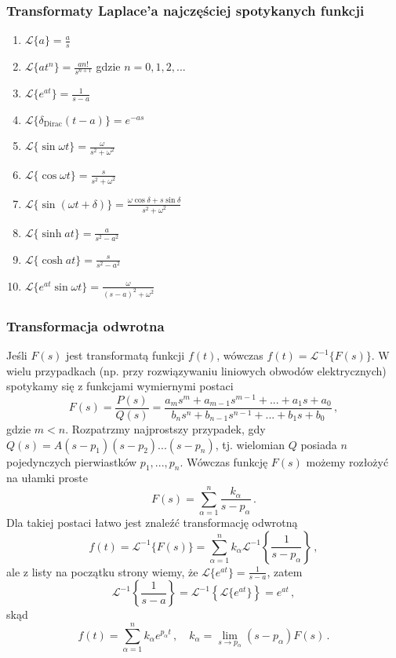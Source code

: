 \documentclass[../main.tex]{subfiles}
\begin{document}
\subsubsection*{Transformaty Laplace'a najczęściej spotykanych funkcji}
\begin{enumerate}
    \item \(\mathscr{L}\{a\}=\frac{a}{s}\)
    \item \(\mathscr{L}\{at^n\}=\frac{an!}{s^{n+1}}\) gdzie \(n=0,1,2,...\)
    \item \(\mathscr{L}\{e^{at}\}=\frac{1}{s-a}\)
    \item \(\mathscr{L}\{\delta_\text{Dirac} (t-a)\}=e^{-as}\)
    \item \(\mathscr{L}\{\sin \omega t\}=\frac{\omega }{s^2+\omega^2}\)
    \item \(\mathscr{L}\{\cos\omega t\}=\frac{s}{s^2+\omega^2}\)
    \item \(\mathscr{L}\{\sin(\omega t+\delta)\}=\frac{\omega\cos\delta+s\sin\delta}{s^2+\omega^2}\)
    \item \(\mathscr{L}\{\sinh{at}\}=\frac{a}{s^2-a^2}\)
    \item \(\mathscr{L}\{\cosh at\}=\frac{s}{s^2-a^2}\)
    \item \(\mathscr{L}\{e^{at}\sin \omega t\}=\frac{\omega}{(s-a)^2+\omega^2}\)
\end{enumerate}
\subsubsection*{Transformacja odwrotna}
Jeśli \(F(s)\) jest transformatą funkcji \(f(t)\), wówczas \(f(t)=\mathscr{L}^{-1}\{F(s)\}\). W wielu przypadkach (np. przy rozwiązywaniu liniowych obwodów elektrycznych) spotykamy się z funkcjami wymiernymi postaci
\begin{equation*}
    F(s)=\frac{P(s)}{Q(s)}=\frac{a_m s^m+a_{m-1}s^{m-1}+...+a_1s+a_0}{b_n s^n+b_{n-1}s^{n-1}+...+b_1s+b_0}\,,
\end{equation*}
gdzie \(m<n\). Rozpatrzmy najprostszy przypadek, gdy \(Q(s)=A (s-p_1)(s-p_2)...(s-p_n)\), tj. wielomian \(Q\) posiada \(n\) pojedynczych pierwiastków \(p_1,...,p_n\). Wówczas funkcję \(F(s)\) możemy rozłożyć na ułamki proste
\begin{equation*}
    F(s)=\sum_{\alpha=1}^n\frac{k_\alpha}{s-p_\alpha}\,.
\end{equation*}
Dla takiej postaci łatwo jest znaleźć transformację odwrotną
\begin{equation*}
    f(t)=\mathscr{L}^{-1}\{F(s)\}=\sum_{\alpha=1}^nk_\alpha\mathscr{L}^{-1}\left\{\frac{1}{s-p_\alpha}\right\}\,,
\end{equation*}
ale z listy na początku strony wiemy, że \(\mathscr{L}\{e^{at}\}=\frac{1}{s-a}\), zatem 
\begin{equation*}
    \mathscr{L}^{-1}\left\{\frac{1}{s-a}\right\}=\mathscr{L}^{-1}\left\{\mathscr{L}\{e^{at}\}\right\}=e^{at}\,,
\end{equation*}
skąd
\begin{equation*}
    f(t)=\sum_{\alpha=1}^nk_\alpha e^{p_\alpha t}\,,\quad k_\alpha=\lim_{s\to p_\alpha} (s-p_\alpha)F(s)\,.
\end{equation*}
\end{document}

